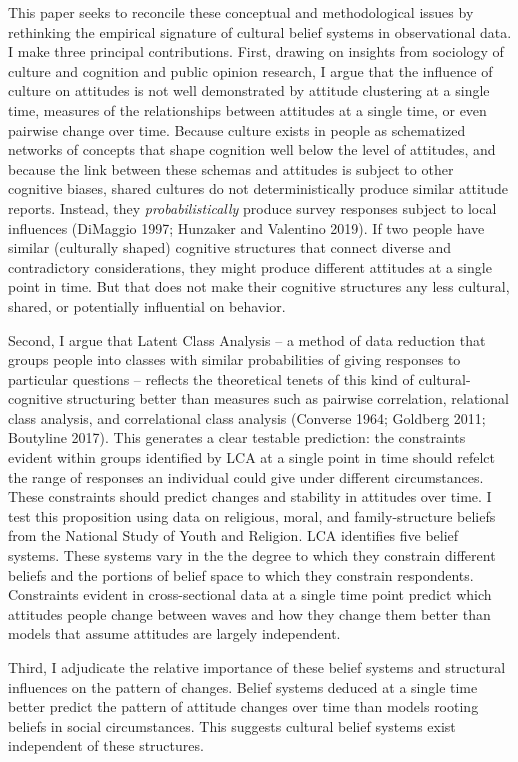 \documentclass[12pt,]{article}
\begin{document}
This paper seeks to reconcile these conceptual and methodological issues by rethinking the empirical signature of cultural belief systems in observational data. I make three principal contributions. First, drawing on insights from sociology of culture and cognition and public opinion research, I argue that the influence of culture on attitudes is not well demonstrated by attitude clustering at a single time, measures of the relationships between attitudes at a single time, or even pairwise change over time. Because culture exists in people as schematized networks of concepts that shape cognition well below the level of attitudes, and because the link between these schemas and attitudes is subject to other cognitive biases, shared cultures do not deterministically produce similar attitude reports. Instead, they \emph{probabilistically} produce survey responses subject to local influences (DiMaggio 1997; Hunzaker and Valentino 2019). If two people have similar (culturally shaped) cognitive structures that connect diverse and contradictory considerations, they might produce different attitudes at a single point in time. But that does not make their cognitive structures any less cultural, shared, or potentially influential on behavior.

Second, I argue that Latent Class Analysis -- a method of data reduction that groups people into classes with similar probabilities of giving responses to particular questions -- reflects the theoretical tenets of this kind of cultural-cognitive structuring better than measures such as pairwise correlation, relational class analysis, and correlational class analysis (Converse 1964; Goldberg 2011; Boutyline 2017). This generates a clear testable prediction: the constraints evident within groups identified by LCA at a single point in time should refelct the range of responses an individual could give under different circumstances. These constraints should predict changes and stability in attitudes over time. I test this proposition using data on religious, moral, and family-structure beliefs from the National Study of Youth and Religion. LCA identifies five belief systems. These systems vary in the the degree to which they constrain different beliefs and the portions of belief space to which they constrain respondents. Constraints evident in cross-sectional data at a single time point predict which attitudes people change between waves and how they change them better than models that assume attitudes are largely independent.

Third, I adjudicate the relative importance of these belief systems and structural influences on the pattern of changes. Belief systems deduced at a single time better predict the pattern of attitude changes over time than models rooting beliefs in social circumstances. This suggests cultural belief systems exist independent of these structures.
\end{document}
